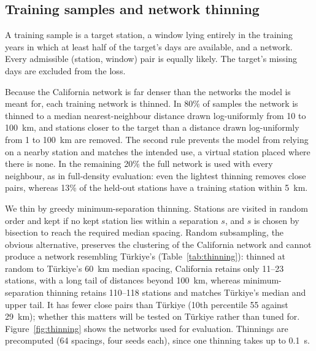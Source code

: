 \documentclass[preprint,12pt,authoryear]{elsarticle}
\begin{document}
\subsection{Training samples and network thinning}
\label{sec:thinning}

A training sample is a target station, a window lying entirely in the training years in
which at least half of the target's days are available, and a network. Every admissible
(station, window) pair is equally likely. The target's missing days are excluded from the loss.

Because the California network is far denser than the networks the model is meant for,
each training network is thinned. In 80\% of samples the network is thinned to a median
nearest-neighbour distance drawn log-uniformly from 10 to 100~km, and stations closer to
the target than a distance drawn log-uniformly from 1 to 100~km are removed. The second
rule prevents the model from relying on a nearby station and matches the intended use, a
virtual station placed where there is none. In the remaining 20\% the full network is
used with every neighbour, as in full-density evaluation: even the lightest thinning
removes close pairs, whereas 13\% of the held-out stations have a training station within 5~km.

We thin by greedy minimum-separation thinning. Stations are visited in random order and
kept if no kept station lies within a separation $s$, and $s$ is chosen by bisection to
reach the required median spacing. Random subsampling, the obvious alternative, preserves
the clustering of the California network and cannot produce a network resembling
T\"urkiye's (Table~\ref{tab:thinning}): thinned at random to T\"urkiye's 60~km median
spacing, California retains only 11--23 stations, with a long tail of distances beyond
100~km, whereas minimum-separation thinning retains 110--118 stations and matches
T\"urkiye's median and upper tail. It has fewer close pairs than T\"urkiye (10th
percentile 55 against 29~km); whether this matters will be tested on T\"urkiye rather
than tuned for. Figure~\ref{fig:thinning} shows the networks used for evaluation.
Thinnings are precomputed (64 spacings, four seeds each), since one thinning takes up to 0.1~s.
\end{document}
